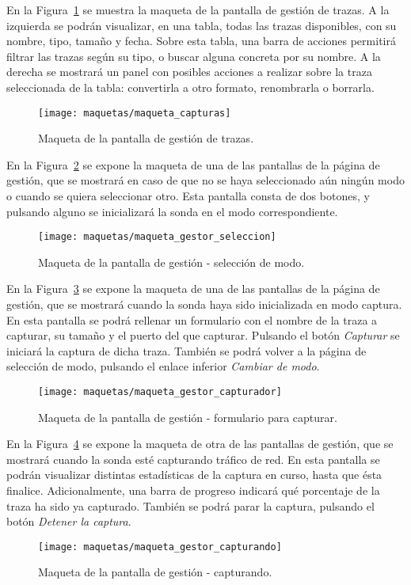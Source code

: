 En la Figura~\ref{fig:maqueta:capturas} se muestra la maqueta de la pantalla de gestión de \glspl{traza}.
A la izquierda se podrán visualizar, en una tabla, todas las \glspl{traza} disponibles, con su nombre, tipo, tamaño y fecha.
Sobre esta tabla, una barra de acciones permitirá filtrar las \glspl{traza} según su tipo, o buscar alguna concreta por su nombre.
A la derecha se mostrará un panel con posibles acciones a realizar sobre la \gls{traza} seleccionada de la tabla: convertirla a otro formato, renombrarla o borrarla.
\begin{figure}[!htp]
  \centering
  \texttt{[image: maquetas/maqueta\_capturas]}
  \caption{Maqueta de la pantalla de gestión de \glspl{traza}.}
  \label{fig:maqueta:capturas}
\end{figure}
\clearpage

En la Figura~\ref{fig:maqueta:gestor_seleccion} se expone la maqueta de una de las pantallas de la página de gestión, que se mostrará en caso de que no se haya seleccionado aún ningún modo o cuando se quiera seleccionar otro.
Esta pantalla consta de dos botones, y pulsando alguno se inicializará la sonda en el modo correspondiente.
\begin{figure}[!htp]
  \centering
  \texttt{[image: maquetas/maqueta\_gestor\_seleccion]}
  \caption{Maqueta de la pantalla de gestión - selección de modo.}
  \label{fig:maqueta:gestor_seleccion}
\end{figure}
\clearpage

En la Figura~\ref{fig:maqueta:gestor_capturador} se expone la maqueta de una de las pantallas de la página de gestión, que se mostrará cuando la sonda haya sido inicializada en modo captura.
En esta pantalla se podrá rellenar un formulario con el nombre de la \gls{traza} a capturar, su tamaño y el puerto del que capturar.
Pulsando el botón \textit{Capturar} se iniciará la captura de dicha \gls{traza}.
También se podrá volver a la página de selección de modo, pulsando el enlace inferior \textit{Cambiar de modo}.
\begin{figure}[!htp]
  \centering
  \texttt{[image: maquetas/maqueta\_gestor\_capturador]}
  \caption{Maqueta de la pantalla de gestión - formulario para capturar.}
  \label{fig:maqueta:gestor_capturador}
\end{figure}
\clearpage

En la Figura~\ref{fig:maqueta:gestor_capturando} se expone la maqueta de otra de las pantallas de gestión, que se mostrará cuando la sonda esté capturando tráfico de red.
En esta pantalla se podrán visualizar distintas estadísticas de la captura en curso, hasta que ésta finalice.
Adicionalmente, una barra de progreso indicará qué porcentaje de la \gls{traza} ha sido ya capturado.
También se podrá parar la captura, pulsando el botón \textit{Detener la captura}.
\begin{figure}[!htp]
  \centering
  \texttt{[image: maquetas/maqueta\_gestor\_capturando]}
  \caption{Maqueta de la pantalla de gestión - capturando.}
  \label{fig:maqueta:gestor_capturando}
\end{figure}
\clearpage

